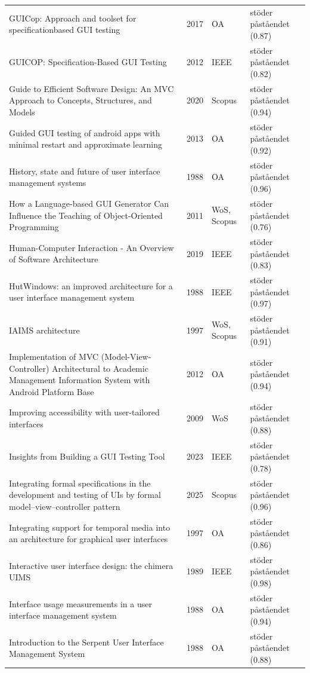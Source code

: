 \begin{longtable}{@{}%
  >{\raggedright\arraybackslash}p{}c%
  >{\raggedright\arraybackslash}p{}%
  >{\raggedright\arraybackslash}p{}@{}}
GUICop: Approach and toolset for specificationbased GUI testing & 2017 & OA & stöder påståendet (0.87) \\
GUICOP: Specification-Based GUI Testing & 2012 & IEEE & stöder påståendet (0.82) \\
Guide to Efficient Software Design: An MVC Approach to Concepts, Structures, and Models & 2020 & Scopus & stöder påståendet (0.94) \\
Guided GUI testing of android apps with minimal restart and approximate learning & 2013 & OA & stöder påståendet (0.92) \\
History, state and future of user interface management systems & 1988 & OA & stöder påståendet (0.96) \\
How a Language-based GUI Generator Can Influence the Teaching of Object-Oriented Programming & 2011 & WoS, Scopus & stöder påståendet (0.76) \\
Human-Computer Interaction - An Overview of Software Architecture & 2019 & IEEE & stöder påståendet (0.83) \\
HutWindows: an improved architecture for a user interface management system & 1988 & IEEE & stöder påståendet (0.97) \\
IAIMS architecture & 1997 & WoS, Scopus & stöder påståendet (0.91) \\
Implementation of MVC (Model-View-Controller) Architectural to Academic Management Information System with Android Platform Base & 2012 & OA & stöder påståendet (0.94) \\
Improving accessibility with user-tailored interfaces & 2009 & WoS & stöder påståendet (0.88) \\
Insights from Building a GUI Testing Tool & 2023 & IEEE & stöder påståendet (0.78) \\
Integrating formal specifications in the development and testing of UIs by formal model--view--controller pattern & 2025 & Scopus & stöder påståendet (0.96) \\
Integrating support for temporal media into an architecture for graphical user interfaces & 1997 & OA & stöder påståendet (0.86) \\
Interactive user interface design: the chimera UIMS & 1989 & IEEE & stöder påståendet (0.98) \\
Interface usage measurements in a user interface management system & 1988 & OA & stöder påståendet (0.94) \\
Introduction to the Serpent User Interface Management System & 1988 & OA & stöder påståendet (0.88) \\

\end{longtable}
